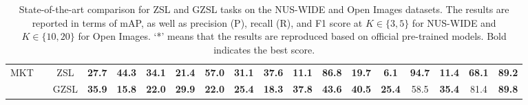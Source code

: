 \begin{table}[t]
{\begin{tabular}{c|c|cccccccc|cccccccc}
\multirow{2}{*}{MKT} 
 &  & ZSL   & \textbf{27.7}  & \textbf{44.3}  & \textbf{34.1}  & \textbf{21.4}  & \textbf{57.0}  & \textbf{31.1}  & \textbf{37.6}  
        & \textbf{11.1}  & \textbf{86.8}  & \textbf{19.7}  & \textbf{6.1}   & \textbf{94.7}  & \textbf{11.4}  & \textbf{68.1}   & \textbf{89.2} \\
 &  & GZSL  & \textbf{35.9}  & \textbf{15.8}  & \textbf{22.0}  & \textbf{29.9}  & \textbf{22.0}  & \textbf{25.4}  & \textbf{18.3}   
        & \textbf{37.8}  & \textbf{43.6}  & \textbf{40.5}  & \textbf{25.4}  & 58.5  & \textbf{35.4}  & 81.4   & \textbf{89.8} \\ 
\cmidrule(lr){3-18}
\bottomrule[0.1em]
\end{tabular}
}
\caption{
State-of-the-art comparison for ZSL and GZSL tasks on the NUS-WIDE and Open Images datasets. 
The results are reported in terms of mAP, as well as precision (P), recall (R), and F1 score at $K{\in}\{3,5\}$ for NUS-WIDE and $K{\in}\{10,20\}$ for Open Images.
`*' means that the results are reproduced based on official pre-trained models.
Bold indicates the best score.}
\label{tab:sota}
\end{table}